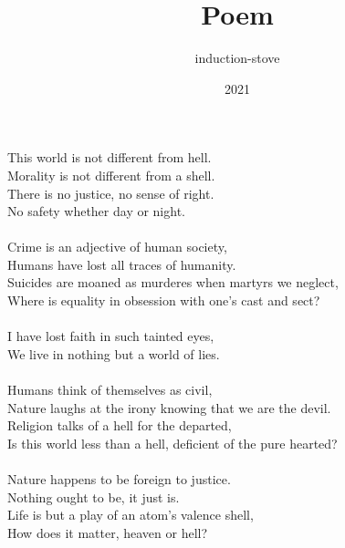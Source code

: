 \documentclass{article}
\title{Poem}
\author{induction-stove}
\date{2021}
\begin{document}
\maketitle
This world is not different from hell.
\\Morality is not different from a shell.
\\There is no justice, no sense of right.
\\No safety whether day or night.
\\\\Crime is an adjective of human society,
\\Humans have lost all traces of humanity.
\\Suicides are moaned as murderes when martyrs we neglect,
\\Where is equality in obsession with one's cast and sect?
\\\\I have lost faith in such tainted eyes,
\\We live in nothing but a world of lies.
\\\\Humans think of themselves as civil,
\\Nature laughs at the irony knowing that we are the devil.
\\Religion talks of a hell for the departed,
\\Is this world less than a hell, deficient of the pure hearted?
\\\\Nature happens to be foreign to justice.
\\Nothing ought to be, it just is.
\\Life is but a play of an atom's valence shell,
\\How does it matter, heaven or hell?
\end{document}
